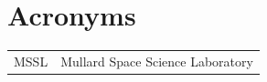 \newpage



\section*{Acronyms}

\begin{tabular}{l l}
MSSL & Mullard Space Science Laboratory\\
\end{tabular}

\newpage
